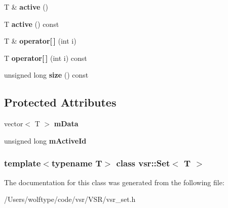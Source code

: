 \begin{DoxyCompactItemize}
\item 
\hypertarget{classvsr_1_1_set_a928b189406d27bf850d5125cf2710584}{T \& {\bfseries active} ()}\label{classvsr_1_1_set_a928b189406d27bf850d5125cf2710584}

\item 
\hypertarget{classvsr_1_1_set_a96fb8a5fe43f972cfbae454de9b73d49}{T {\bfseries active} () const }\label{classvsr_1_1_set_a96fb8a5fe43f972cfbae454de9b73d49}

\item 
\hypertarget{classvsr_1_1_set_ace17e9eecc3f487a1787d65616d5afcd}{T \& {\bfseries operator\mbox{[}$\,$\mbox{]}} (int i)}\label{classvsr_1_1_set_ace17e9eecc3f487a1787d65616d5afcd}

\item 
\hypertarget{classvsr_1_1_set_a064929d9c4c5ac66024429813569af97}{T {\bfseries operator\mbox{[}$\,$\mbox{]}} (int i) const }\label{classvsr_1_1_set_a064929d9c4c5ac66024429813569af97}

\item 
\hypertarget{classvsr_1_1_set_a7b952bd82b7e7a7ea706d754dbae7e85}{unsigned long {\bfseries size} () const }\label{classvsr_1_1_set_a7b952bd82b7e7a7ea706d754dbae7e85}

\end{DoxyCompactItemize}
\subsection*{Protected Attributes}
\begin{DoxyCompactItemize}
\item 
\hypertarget{classvsr_1_1_set_a1c4c92d53fc43034ca6cc5e7a08c1319}{vector$<$ T $>$ {\bfseries m\-Data}}\label{classvsr_1_1_set_a1c4c92d53fc43034ca6cc5e7a08c1319}

\item 
\hypertarget{classvsr_1_1_set_aedfbef2830b4a1e725026dbe9702cdaa}{unsigned long {\bfseries m\-Active\-Id}}\label{classvsr_1_1_set_aedfbef2830b4a1e725026dbe9702cdaa}

\end{DoxyCompactItemize}
\subsubsection*{template$<$typename T$>$ class vsr\-::\-Set$<$ T $>$}



The documentation for this class was generated from the following file\-:\begin{DoxyCompactItemize}
\item 
/\-Users/wolftype/code/vsr/\-V\-S\-R/vsr\-\_\-set.\-h\end{DoxyCompactItemize}
